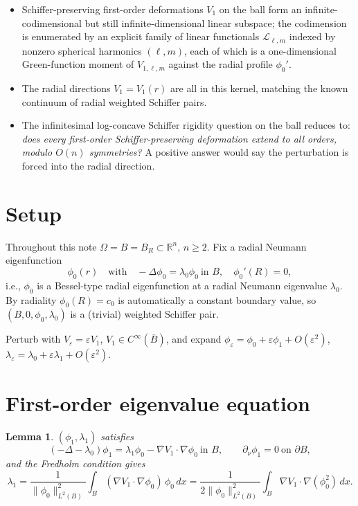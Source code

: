 \documentclass[11pt]{article}
\newcommand{\R}{\mathbb{R}}
\newcommand{\Om}{\Omega}
\newcommand{\eps}{\varepsilon}
\newcommand{\1}{\mathbf 1}
\newcommand{\nor}{\partial_\nu}
\newtheorem{lem}{Lemma}
\begin{document}
\begin{itemize}[leftmargin=*]
    \item Schiffer-preserving first-order deformations $V_1$ on the
    ball form an infinite-codimensional but still infinite-dimensional
    linear subspace; the codimension is enumerated by an explicit
    family of linear functionals $\mathcal{L}_{\ell,m}$ indexed by
    nonzero spherical harmonics $(\ell,m)$, each of which is a
    one-dimensional Green-function moment of $V_{1,\ell,m}$ against
    the radial profile $\phi_0'$.
    \item The radial directions $V_1=V_1(r)$ are all in this kernel,
    matching the known continuum of radial weighted Schiffer pairs.
    \item The infinitesimal log-concave Schiffer rigidity question on
    the ball reduces to: \emph{does every first-order Schiffer-preserving
    deformation extend to all orders, modulo $O(n)$ symmetries?} A
    positive answer would say the perturbation is forced into the
    radial direction.
\end{itemize}

\section{Setup}

Throughout this note $\Om=B=B_R\subset\R^n$, $n\ge 2$. Fix a radial
Neumann eigenfunction
\[
    \phi_0(r) \quad\text{with}\quad
    -\Delta\phi_0=\lambda_0\phi_0\ \text{in }B,\quad
    \phi_0'(R)=0,
\]
i.e., $\phi_0$ is a Bessel-type radial eigenfunction at a radial
Neumann eigenvalue $\lambda_0$. By radiality $\phi_0(R)=c_0$ is
automatically a constant boundary value, so $(B,0,\phi_0,\lambda_0)$
is a (trivial) weighted Schiffer pair.

Perturb with $V_\eps=\eps V_1$, $V_1\in C^\infty(\overline B)$, and
expand $\phi_\eps=\phi_0+\eps\phi_1+O(\eps^2)$,
$\lambda_\eps=\lambda_0+\eps\lambda_1+O(\eps^2)$.

\section{First-order eigenvalue equation}

\begin{lem}\label{lem:order1}
$(\phi_1,\lambda_1)$ satisfies
\begin{equation}\label{eq:firstorder}
    (-\Delta-\lambda_0)\phi_1=\lambda_1\phi_0-\nabla V_1\cdot\nabla\phi_0
    \ \text{in }B,\qquad
    \nor\phi_1=0\ \text{on }\partial B,
\end{equation}
and the Fredholm condition gives
\begin{equation}\label{eq:lambda1}
    \lambda_1=\frac{1}{\|\phi_0\|^2_{L^2(B)}}
    \int_B(\nabla V_1\cdot\nabla\phi_0)\,\phi_0\,dx
    =\frac{1}{2\|\phi_0\|^2_{L^2(B)}}
    \int_B \nabla V_1\cdot\nabla(\phi_0^2)\,dx.
\end{equation}
\end{lem}
\end{document}
